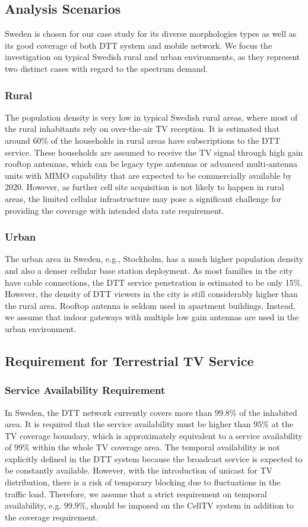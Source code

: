 \documentclass[journal]{IEEEtran}
\begin{document}
\subsection{Analysis Scenarios}
Sweden is chosen for our case study for its diverse morphologies types as well as its good coverage of both DTT system and mobile network. We focus the investigation on typical Swedish rural and urban environments, as they represent two distinct cases with regard to the spectrum demand.
\subsubsection{\textbf{Rural}}
 The population density is very low in typical Swedish rural areas, where most of the rural inhabitants rely on over-the-air TV reception. It is estimated that around 60\% of the households in rural areas have subscriptions to the DTT service\cite{Tera}. These households are assumed to receive the TV signal through high gain rooftop antennas, which can be legacy type antennas or advanced multi-antenna units with MIMO capability that are expected to be commercially available by 2020. However, as further cell site acquisition is not likely to happen in rural areas, the limited cellular infrastructure may pose a significant challenge for providing the coverage with intended data rate requirement.


\subsubsection{\textbf{Urban}}
The urban area in Sweden, e.g., Stockholm, has a much higher population density and also a denser cellular base station deployment. As most families in the city have cable connections, the DTT service penetration is estimated to be only 15\%\cite{PTS1}. However, the density of DTT viewers in the city is still considerably higher than the rural area. Rooftop antenna is seldom used in apartment buildings. Instead, we assume that indoor gateways with multiple low gain antennas are used in the urban environment.

\subsection{Requirement for Terrestrial TV Service} \label{sec:TV_model}
\subsubsection{\textbf{Service Availability Requirement}}
In Sweden, the DTT network currently covers more than $99.8\%$ of the inhabited area. It is required that the service availability must be higher than $95\%$ at the TV coverage boundary, which is approximately equivalent to a service availability of $99\%$ within the whole TV coverage area.
The temporal availability is not explicitly defined in the DTT system because the broadcast service is expected to be constantly available. However, with the introduction of unicast for TV distribution, there is a risk of temporary blocking due to fluctuations in the traffic load. Therefore, we assume that a strict requirement on temporal availability, e.g. $99.9\%$, should be imposed on the CellTV system in addition to the coverage requirement.
\end{document}
